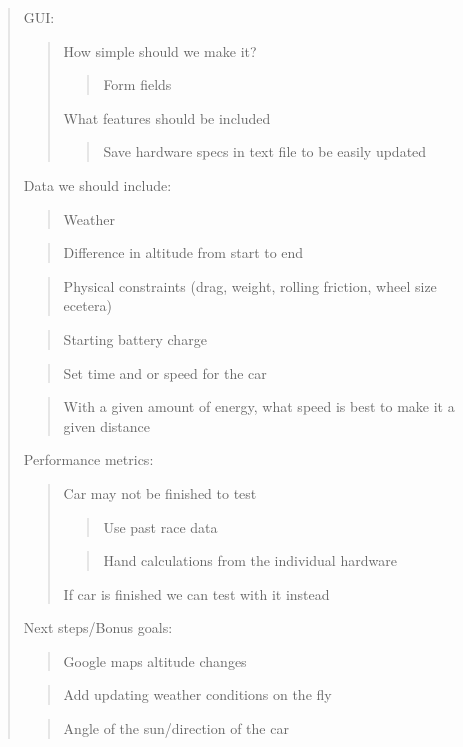 \begin{singlespace}
\begin{quote}
GUI:
    \begin{quote}
	How simple should we make it?
	    \begin{quote}
		Form fields
		\end{quote}
	What features should be included
	    \begin{quote}
		Save hardware specs in text file to be easily updated
		\end{quote}
	\end{quote}
	
Data we should include:
    \begin{quote}
	Weather
	\end{quote}
	\begin{quote}
	Difference in altitude from start to end
	\end{quote}
	\begin{quote}
	Physical constraints (drag, weight, rolling friction, wheel size ecetera)
	\end{quote}
	\begin{quote}
	Starting battery charge
	\end{quote}
	\begin{quote}
	Set time and or speed for the car
	\end{quote}
	\begin{quote}
	With a given amount of energy, what speed is best to make it a given distance
	\end{quote}
	
Performance metrics:
    \begin{quote}
	Car may not be finished to test
	    \begin{quote}
		Use past race data
		\end{quote}
	    \begin{quote}
		Hand calculations from the individual hardware
		\end{quote}
	If car is finished we can test with it instead
	\end{quote}

Next steps/Bonus goals:
    \begin{quote}
	Google maps altitude changes
	\end{quote}
	\begin{quote}
	Add updating weather conditions on the fly
	\end{quote}
	\begin{quote}
    Angle of the sun/direction of the car
    \end{quote}
\end{quote}


\end{singlespace}
